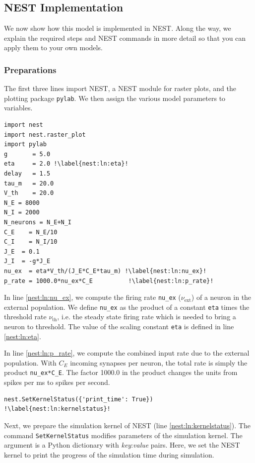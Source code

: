 \documentclass{article}
\begin{document}
\subsection{NEST Implementation}\label{nest:sec:brunel_impl}

We now show how this model is implemented in NEST. Along the way, we
explain the required steps and NEST commands in more detail so that
you can apply them to your own models.

\subsubsection{Preparations}
The first three lines import NEST, a NEST module for raster plots, and
the plotting package \lstinline!pylab!. We then assign the various model
parameters to variables.
\begin{lstlisting}[name=Brunel_interactive]
import nest
import nest.raster_plot
import pylab
g       = 5.0 
eta     = 2.0 !\label{nest:ln:eta}!
delay   = 1.5 
tau_m   = 20.0
V_th    = 20.0
N_E = 8000
N_I = 2000
N_neurons = N_E+N_I
C_E    = N_E/10
C_I    = N_I/10
J_E  = 0.1
J_I  = -g*J_E
nu_ex  = eta*V_th/(J_E*C_E*tau_m) !\label{nest:ln:nu_ex}!
p_rate = 1000.0*nu_ex*C_E          !\label{nest:ln:p_rate}!
\end{lstlisting}
In line \ref{nest:ln:nu_ex}, we compute the firing rate
\lstinline!nu_ex! ($\nu_{\text{ext}}$) of a neuron in the external population. We define
\lstinline!nu_ex! as the product of a constant \lstinline!eta! times
the threshold rate $\nu_{\text{th}}$, i.e. the steady state firing
rate which is needed to bring a neuron to threshold. The value of the
scaling constant  \lstinline!eta! is defined in line \ref{nest:ln:eta}.

In line \ref{nest:ln:p_rate}, we compute the combined input rate due to the
external population. With $C_E$ incoming synapses per neuron, the total rate is
simply the product \lstinline!nu_ex*C_E!. The factor 1000.0 in the
product changes the units from spikes per ms to spikes per second.
 
\begin{lstlisting}[name=Brunel_interactive]
nest.SetKernelStatus({'print_time': True}) !\label{nest:ln:kernelstatus}!
\end{lstlisting}
Next, we prepare the simulation kernel of NEST (line
\ref{nest:ln:kernelstatus}). The command \lstinline!SetKernelStatus!
modifies parameters of the simulation kernel. The argument is a Python
dictionary with \emph{key}:\emph{value} pairs. Here, we set the NEST
kernel to print the progress of the simulation time during simulation.
\end{document}
